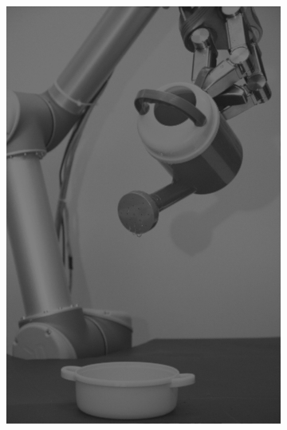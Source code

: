\begin{figure}[H]
\begin{subfigure}[b]{0.1\textwidth}
        \includegraphics[width=\textwidth]{img3/test/contrast_5_0_5_final_img3.png}
    \end{subfigure}
    \begin{subfigure}[b]{0.1\textwidth}

\end{subfigure}
\end{figure}
